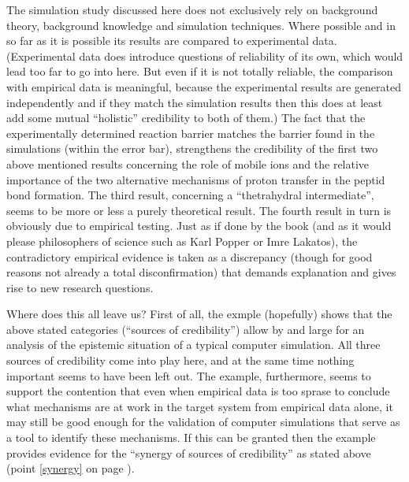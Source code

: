 \documentclass[onecollarge]{STJour}
\numberwithin{equation}{section}
\begin{document}
The simulation study discussed here does not exclusively rely on
background theory, background knowledge and simulation techniques. Where
possible and in so far as it is possible its results are compared to
experimental data. (Experimental data does introduce questions of
reliability of its own, which would lead too far to go into here. But
even if it is not totally reliable, the comparison with empirical data is
meaningful, because the experimental results are generated independently
and if they match the simulation results then this does at least add
some mutual ``holistic'' credibility to both of them.) The fact that the
experimentally determined reaction barrier matches the barrier found in
the simulations (within the error bar), strengthens the credibility of
the first two above mentioned results concerning the role of mobile ions and
the relative importance of the two alternative mechanisms of proton
transfer in the peptid bond formation. The third result,
concerning a ``thetrahydral intermediate'', seems to be more or less a
purely theoretical result. The fourth result in turn is obviously due to
empirical testing. Just as if done by the book (and as it would please
philosophers of science such as Karl Popper or Imre Lakatos), the
contradictory empirical evidence is taken as a discrepancy (though for
good reasons not already a total disconfirmation) that demands
explanation and gives rise to new research questions.

Where does this all leave us? First of all, the exmple (hopefully) shows
that the above stated categories (``sources of credibility'') allow by
and large for an analysis of the epistemic situation of a typical
computer simulation. All three sources of credibility come into play
here, and at the same time nothing important seems to have been left out.
The example, furthermore, seems to support the contention that even when
empirical data is too sprase to conclude what mechanisms are at work in
the target system from empirical data alone, it may still be good enough
for the validation of computer simulations that serve as a tool to
identify these mechanisms. If this can be granted then the example
provides evidence for the ``synergy of sources of credibility'' as stated
above (point \ref{synergy} on page \pageref{synergy}).
\end{document}
